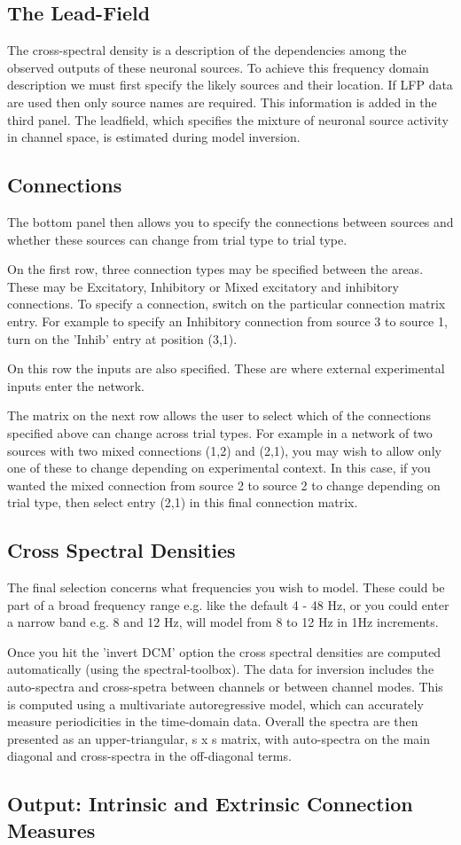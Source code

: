 \subsection{The Lead-Field}
The cross-spectral density is a description of the dependencies among the observed outputs of these neuronal sources. To achieve this frequency domain description we must first specify the likely sources and their location. If LFP data are used then only source names are required. This information is added in the third panel. The leadfield, which specifies the mixture of neuronal source activity in channel space, is estimated during model inversion.

\subsection{Connections}
The bottom panel then allows you to specify the connections between sources and whether these sources can change from trial type to trial type. 

On the first row, three connection types may be specified between the areas. These may be Excitatory, Inhibitory or Mixed excitatory and inhibitory connections. To specify a connection, switch on the particular connection matrix entry. For example to specify an Inhibitory connection from source 3 to source 1, turn on the 'Inhib' entry at position (3,1).

On this row the inputs are also specified. These are where external experimental inputs enter the network.

The matrix on the next row allows the user to select which of the connections specified above can change across trial types. For example in a network of two sources with two mixed connections (1,2) and (2,1), you may wish to allow only one of these to change depending on experimental context. In this case, if you wanted the mixed connection from source 2 to source 2 to change depending on trial type, then select entry (2,1) in this final connection matrix.

\subsection{Cross Spectral Densities}
The final selection concerns what frequencies you wish to model. These could be part of a broad frequency range e.g. like the default 4 - 48 Hz, or you could enter a narrow band e.g. 8 and 12 Hz, will model from 8 to 12 Hz in 1Hz increments.

Once you hit the 'invert DCM' option the cross spectral densities are computed automatically (using the spectral-toolbox). The data for inversion includes the auto-spectra and cross-spetra between channels or between channel modes. This is computed using a multivariate autoregressive model, which can accurately measure periodicities in the time-domain data. Overall the spectra are then presented as an upper-triangular, s x s matrix, with auto-spectra on the main diagonal and cross-spectra in the off-diagonal terms.

\subsection{Output: Intrinsic and Extrinsic Connection Measures}
